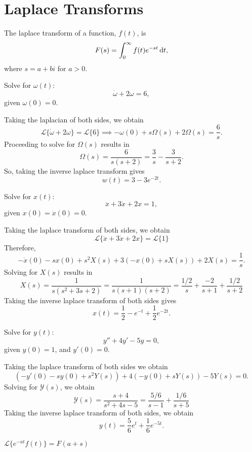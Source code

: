 \chapter{Laplace Transforms}

The \alert{laplace transform} of a function, $f(t)$, is 
$$F(s) = \int_0^{\infty} f(t)e^{-st} \dif t,$$ where $s = a + bi$ for $a > 0$.

\begin{example}
    Solve for $\omega(t)$: 
    $$\dot{\omega}+2\omega = 6,$$
    given $\omega(0) = 0$.
\end{example}
\begin{soln}
    Taking the laplacian of both sides, we obtain
    $$\mathcal{L} \{ \dot{\omega}+2\omega \} = \mathcal{L} \{6\}
    \implies -\omega(0) + s\Omega(s)+2\Omega(s) = \frac{6}{s}.$$
    Proceeding to solve for $\Omega(s)$ results in
    $$\Omega(s) = \frac{6}{s(s+2)} = \frac{3}{s} - \frac{3}{s+2}.$$
    So, taking the inverse laplace transform gives
    $$w(t) = 3-3e^{-2t}.$$
\end{soln}

\begin{example}
    Solve for $x(t)$:
    $$\ddot{x}+3\dot{x}+2x = 1,$$
    given $x(0) = \dot{x}(0) = 0$.
\end{example}
\begin{soln}
    Taking the laplace transform of both sides, we obtain
    $$\mathcal{L}\{\ddot{x}+3\dot{x}+2x\} = \mathcal{L}\{1\}$$
    Therefore, $$-\dot{x}(0)-sx(0)+s^2X(s)+3(-x(0)+sX(s))+2X(s)=\frac{1}{s}.$$
    Solving for $X(s)$ results in 
    $$X(s) = \frac{1}{s(s^2+3s+2)} = \frac{1}{s(s+1)(s+2)} = \frac{1/2}{s}+\frac{-2}{s+1}+\frac{1/2}{s+2}$$
    Taking the inverse laplace transform of both sides gives
    $$x(t) = \frac{1}{2}-e^{-t}+\frac{1}{2}e^{-2t}.$$
\end{soln}

\begin{example}
    Solve for $y(t)$:
    $$y''+4y'-5y=0,$$
    given $y(0)=1$, and $y'(0)=0$.
\end{example}
\begin{soln}
    Taking the laplace transform of both sides we obtain
    $$\left( -y'(0)-sy(0)+s^2Y(s)\right)+4\left( -y(0)+sY(s)\right)-5Y(s)=0.$$
    Solving for $\mathcal{Y}(s)$, we obtain
    $$\mathcal{Y}(s) = \frac{s+4}{s^2+4s-5} = \frac{5/6}{s-1}+\frac{1/6}{s+5}$$
    Taking the inverse laplace transform of both sides, we obtain
    $$y(t) = \frac{5}{6}e^t+\frac{1}{6}e^{-5t}.$$
\end{soln}
\begin{theorem}
    $\mathcal{L}\{e^{-at}f(t)\} = F(a+s)$
\end{theorem}

